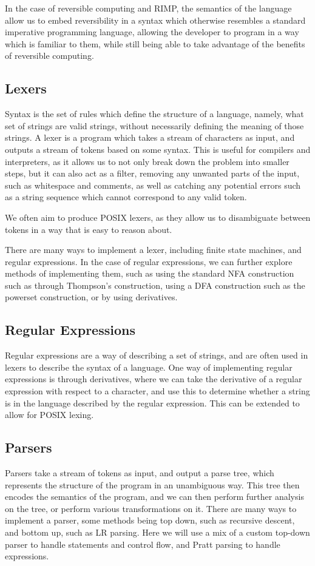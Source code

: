 In the case of reversible computing and RIMP, the semantics of the language allow us to embed reversibility in a syntax which otherwise resembles a standard imperative programming language, allowing the developer to program in a way which is familiar to them, while still being able to take advantage of the benefits of reversible computing.

\subsection*{Lexers}\label{subsec:lexers}
Syntax is the set of rules which define the structure of a language, namely, what set of strings are valid strings, without necessarily defining the meaning of those strings.
A lexer is a program which takes a stream of characters as input, and outputs a stream of tokens based on some syntax.
This is useful for compilers and interpreters, as it allows us to not only break down the problem into smaller steps, but it can also act as a filter, removing any unwanted parts of the input, such as whitespace and comments, as well as catching any potential errors such as a string sequence which cannot correspond to any valid token.

We often aim to produce POSIX lexers, as they allow us to disambiguate between tokens in a way that is easy to reason about.

There are many ways to implement a lexer, including finite state machines, and regular expressions.
In the case of regular expressions, we can further explore methods of implementing them, such as using the standard NFA construction such as through Thompson's construction, using a DFA construction such as the powerset construction, or by using derivatives.

\subsection*{Regular Expressions}\label{subsec:regex}
Regular expressions are a way of describing a set of strings, and are often used in lexers to describe the syntax of a language.
One way of implementing regular expressions is through derivatives, where we can take the derivative of a regular expression with respect to a character, and use this to determine whether a string is in the language described by the regular expression.
This can be extended to allow for POSIX lexing.

\subsection*{Parsers}\label{subsec:parsers}
Parsers take a stream of tokens as input, and output a parse tree, which represents the structure of the program in an unambiguous way.
This tree then encodes the semantics of the program, and we can then perform further analysis on the tree, or perform various transformations on it.
There are many ways to implement a parser, some methods being top down, such as recursive descent, and bottom up, such as LR parsing.
Here we will use a mix of a custom top-down parser to handle statements and control flow, and Pratt parsing to handle expressions.


